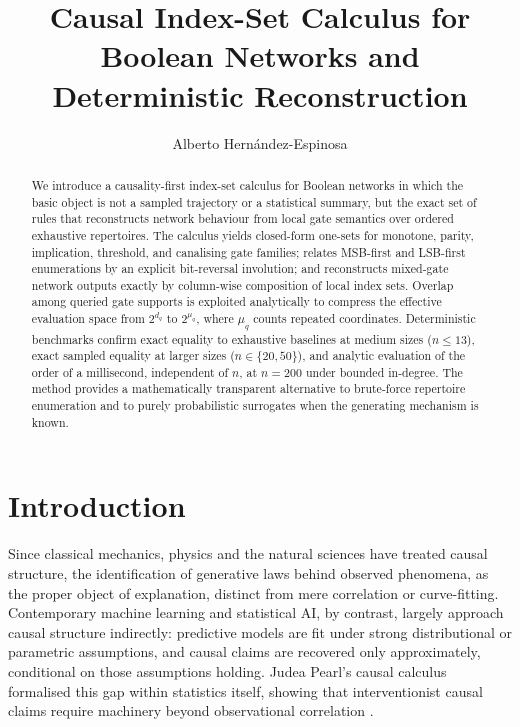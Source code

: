 \documentclass[11pt]{article}
\title{Causal Index-Set Calculus for Boolean Networks and Deterministic Reconstruction}
\author{Alberto Hernández-Espinosa}
\date{}
\theoremstyle{definition}
\begin{document}
\maketitle

\begin{abstract}
We introduce a causality-first index-set calculus for Boolean networks in which the basic
object is not a sampled trajectory or a statistical summary, but the exact set of rules that
reconstructs network behaviour from local gate semantics over ordered exhaustive repertoires.
The calculus yields closed-form one-sets for monotone, parity, implication, threshold, and
canalising gate families; relates MSB-first and LSB-first enumerations by an explicit
bit-reversal involution; and reconstructs mixed-gate network outputs exactly by column-wise
composition of local index sets. Overlap among queried gate supports is exploited analytically
to compress the effective evaluation space from \(2^{d_q}\) to \(2^{\mu_q}\), where \(\mu_q\)
counts repeated coordinates. Deterministic benchmarks confirm exact equality to exhaustive
baselines at medium sizes (\(n\leq 13\)), exact sampled equality at larger sizes
(\(n\in\{20,50\}\)), and analytic evaluation of the order of a millisecond, independent of \(n\), at \(n=200\) under bounded
in-degree. The method provides a mathematically transparent alternative to brute-force
repertoire enumeration and to purely probabilistic surrogates when the generating mechanism
is known.
\end{abstract}

\section{Introduction}
Since classical mechanics, physics and the natural sciences have
treated causal structure, the identification of generative laws behind observed phenomena, as the
proper object of explanation, distinct from mere correlation or curve-fitting. Contemporary machine
learning and statistical AI, by contrast, largely approach causal structure indirectly: predictive models
are fit under strong distributional or parametric assumptions, and causal claims are recovered only
approximately, conditional on those assumptions holding. Judea Pearl's causal calculus formalised this gap
within statistics itself, showing that interventionist causal claims require machinery beyond
observational correlation \cite{pearl2009causality}.
\end{document}
